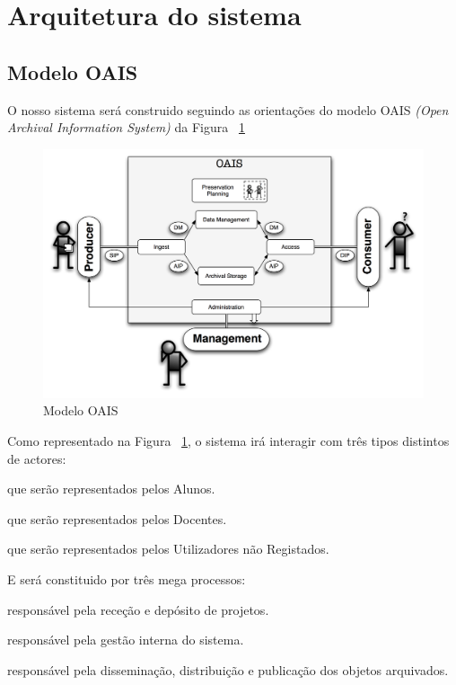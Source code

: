 \section{Arquitetura do sistema}
\subsection{Modelo OAIS}
O nosso sistema será construido seguindo as orientações do modelo OAIS \textit{(Open Archival Information System)} da Figura ~\ref{fig:oais}

\begin{figure}[H] 
  \centering
  \includegraphics[width=1\textwidth,center]{images/arquitetura/oais}
  \caption{Modelo OAIS}
  \label{fig:oais}
\end{figure}

Como representado na Figura ~\ref{fig:oais}, o sistema irá interagir com três tipos distintos de actores:
\begin{description}[labelindent=1cm]
  \item[Produtores] que serão representados pelos Alunos.
  \item[Administrador] que serão representados pelos Docentes.
  \item[Consumidor] que serão representados pelos Utilizadores não Registados.
\end{description}
E será constituido por três mega processos:
\begin{description}[labelindent=1cm]
  \item[Ingestão] responsável pela receção e depósito de projetos.
  \item[Administração] responsável pela gestão interna do sistema.
  \item[Disseminação] responsável pela disseminação, distribuição e publicação dos objetos arquivados.
\end{description}

